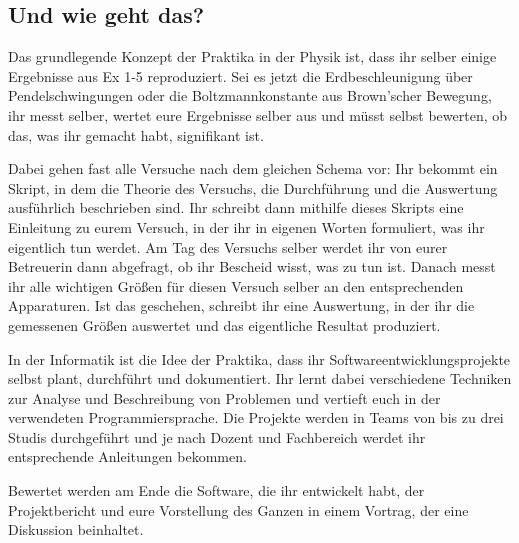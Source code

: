 \subsection{Und wie geht das?}

Das grundlegende Konzept der Praktika in der Physik ist, dass ihr selber einige Ergebnisse aus \gls{Ex} 1-5 reproduziert. Sei es jetzt die Erdbeschleunigung über Pendelschwingungen oder die Boltzmannkonstante aus Brown'scher Bewegung, ihr messt selber, wertet eure Ergebnisse selber aus und müsst selbst bewerten, ob das, was ihr gemacht habt, signifikant ist.

Dabei gehen fast alle Versuche nach dem gleichen Schema vor: Ihr bekommt ein Skript, in dem die Theorie des Versuchs, die Durchführung und die Auswertung ausführlich beschrieben sind. Ihr schreibt dann mithilfe dieses Skripts eine Einleitung zu eurem Versuch, in der ihr in eigenen Worten formuliert, was ihr eigentlich tun werdet. Am Tag des Versuchs selber werdet ihr von eurer Betreuerin dann abgefragt, ob ihr Bescheid wisst, was zu tun ist. Danach messt ihr alle wichtigen Größen für diesen Versuch selber an den entsprechenden Apparaturen. Ist das geschehen, schreibt ihr eine Auswertung, in der ihr die gemessenen Größen auswertet und das eigentliche Resultat produziert.

In der Informatik ist die Idee der Praktika, dass ihr Softwareentwicklungsprojekte selbst plant, durchführt und dokumentiert. Ihr lernt dabei verschiedene Techniken zur Analyse und Beschreibung von Problemen und vertieft euch in der verwendeten Programmiersprache. Die Projekte werden in Teams von bis zu drei Studis durchgeführt und je nach Dozent und Fachbereich werdet ihr entsprechende Anleitungen bekommen.

Bewertet werden am Ende die Software, die ihr entwickelt habt, der Projektbericht und eure Vorstellung des Ganzen in einem Vortrag, der eine Diskussion beinhaltet.